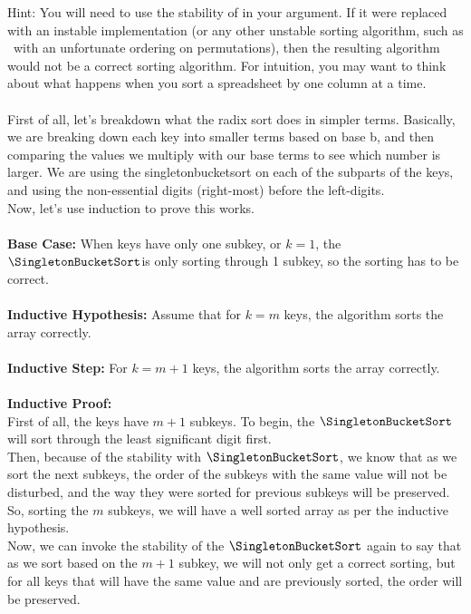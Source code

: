 \documentclass[11pt]{article}
\begin{document}
\begin{enumerate}
\begin{enumerate}
            Hint: You will need to use the stability of \SingletonBucketSort in your argument. If it were replaced with an instable implementation (or any other unstable sorting algorithm, such as \ExhaustiveSearchSort\ with an unfortunate ordering on permutations), then the resulting algorithm would not be a correct sorting algorithm.   For intuition, you may want to think about what happens when you sort a spreadsheet by one column at a time. 
            \\
            \\ First of all, let's breakdown what the radix sort does in simpler terms. Basically, we are breaking down each key into smaller terms based on base b, and then comparing the values we multiply with our base terms to see which number is larger. We are using the singletonbucketsort on each of the subparts of the keys, and using the non-essential digits (right-most) before the left-digits.
            \\ Now, let's use induction to prove this works. 
            \\\\
            \textbf{Base Case:} When keys have only one subkey, or $k = 1$, the $\SingletonBucketSort $is only sorting through 1 subkey, so the sorting has to be correct.
            \\\\
            \textbf{Inductive Hypothesis:} Assume that for $k = m$ keys, the algorithm sorts the array correctly. 
            \\\\
            \textbf{Inductive Step:} For $k = m + 1$ keys, the algorithm sorts the array correctly. 
            \\\\
            \textbf{Inductive Proof:} 
            \\ First of all, the keys have $m + 1$ subkeys. To begin, the $\SingletonBucketSort$ will sort through the least significant digit first.
            \\ Then, because of the stability with $\SingletonBucketSort$, we know that as we sort the next subkeys, the order of the subkeys with the same value will not be disturbed, and the way they were sorted for previous subkeys will be preserved. 
            \\ So, sorting the $m$ subkeys, we will have a well sorted array as per the inductive hypothesis.
            \\ Now, we can invoke the stability of the $\SingletonBucketSort$ again to say that as we sort based on the $m+1$ subkey, we will not only get a correct sorting, but for all keys that will have the same value and are previously sorted, the order will be preserved. 
            \\
            

\end{enumerate}
\end{enumerate}
\end{document}
